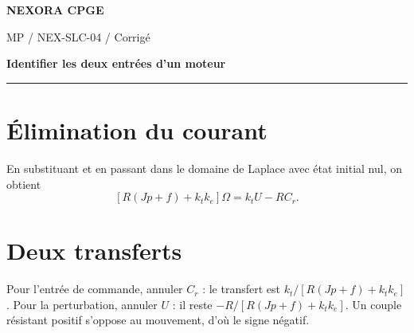 \documentclass[11pt,a4paper]{article}
\begin{document}
{\small\bfseries\color{nexorablue} NEXORA CPGE}\par
{\small MP / NEX-SLC-04 / Corrigé}\par
{\LARGE\bfseries Identifier les deux entrées d’un moteur}\par
\vspace{0.25em}\hrule\vspace{0.6em}

\section*{Élimination du courant}
En substituant et en passant dans le domaine de Laplace avec état initial nul, on obtient
\[ [R(Jp+f)+k_tk_e]\Omega=k_t U-RC_r. \]

\section*{Deux transferts}
Pour l’entrée de commande, annuler $C_r$ : le transfert est $k_t/[R(Jp+f)+k_tk_e]$. Pour la perturbation, annuler $U$ : il reste $-R/[R(Jp+f)+k_tk_e]$. Un couple résistant positif s’oppose au mouvement, d’où le signe négatif.
\end{document}
